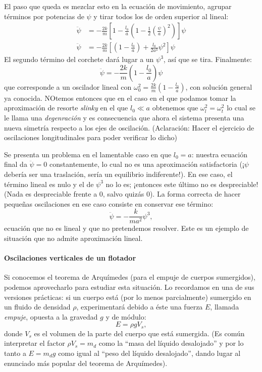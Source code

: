 \documentclass[a4paper,spanish]{article}
\numberwithin{equation}{section}
\begin{document}
El paso que queda es mezclar esto en la ecuación de movimiento, agrupar términos por potencias de $\psi$ y tirar todos los de orden superior al lineal:
		\begin{align*}
			\ddot{\psi} &= -\frac{2k}{m}\left[1-\frac{l_0}{a}\left(1-\frac{1}{2}\left(\frac{\psi}{a}\right)^2\right)\right] \psi \\
			\ddot{\psi} &= -\frac{2k}{m}\left[\left(1-\frac{l_0}{a}\right)+\frac{l_0}{2a^3}\psi^2\right] \psi
		\end{align*}
El segundo término del corchete dará lugar a un $\psi^3$, así que se tira. Finalmente:
		\begin{equation}
			\ddot{\psi} = -\frac{2k}{m}\left(1-\frac{l_0}{a}\right)\psi
                        \label{eq:oscilador_transversal_pequenias_oscilaciones}
		\end{equation}
que corresponde a un oscilador lineal con $\omega_0^2=\frac{2k}{m}(1-\frac{l_0}{a})$, con solución general ya conocida. NOtemos entonces que en el caso en el que podamos tomar la aproximaci\'on de resorte \textit{slinky} en el que $l_0 \ll a$ obtenemos que $\omega_{l}^2=\omega_{t}^2$ lo cual se le llama una \textit{degenraci\'on} y es consecuencia que ahora el sistema presenta una nueva simetr\'ia respecto a los ejes de oscilaci\'on. (Aclaraci\'on: Hacer el ejercicio de oscilaciones longitudinales para poder verificar lo dicho)


Se presenta un problema en el lamentable caso en que $l_0=a$: nuestra ecuación final da $\ddot{\psi}=0$ constantemente, lo cual no es una aproximación satisfactoria (¡$\psi$ debería ser una traslación, sería un equilibrio indiferente!). En ese caso, el término lineal es nulo y el de $\psi^3$ no lo es; ¡entonces este último no es despreciable! (Nada es despreciable frente a 0, salvo quizás 0). La forma correcta de hacer pequeñas oscilaciones en ese caso consiste en conservar ese término:
		\[
			\ddot{\psi} = -\frac{k}{ma^2}\psi^3,
		\]
ecuación que no es lineal y que no pretendemos resolver. Este es un ejemplo de situación que no admite aproximación lineal.

\paragraph{Oscilaciones verticales de un flotador} Si conocemos el teorema de Arquímedes (para el empuje de cuerpos sumergidos), podemos aprovecharlo para estudiar esta situación. Lo recordamos en una de sus versiones prácticas: si un cuerpo está (por lo menos parcialmente) sumergido en un fluido de densidad $\rho$, experimentará debido a éste una fuerza $E$, llamada \textit{empuje}, opuesta a la gravedad $g$ y de módulo:
		\[
			E=\rho g V_s,
		\]
		donde $V_s$ es el volumen de la parte del cuerpo que está sumergida. (Es común interpretar el factor $\rho V_s = m_d$ como la ``masa del líquido desalojado'' y por lo tanto a $E = m_d g$ como igual al ``peso del líquido desalojado'', dando lugar al enunciado más popular del teorema de Arquímedes).
		
\end{document}

